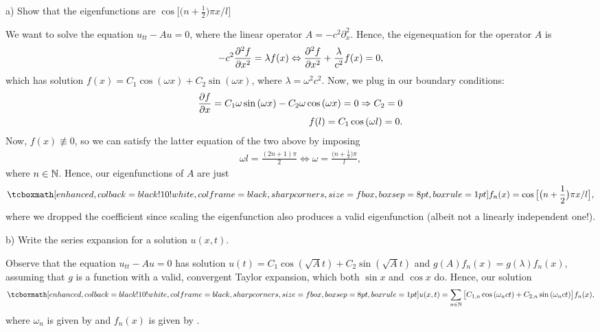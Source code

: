 \def\duedate{10/13/22}
\def\HWnum{5}



    


a) Show that the eigenfunctions are $\cos{\big[ \big( n+\frac{1}{2} \big) \pi x / l \big]}$

We want to solve the equation $u_{tt} - Au = 0$, where the linear operator $A = -c^2\partial_{x}^2$.
Hence, the eigenequation for the operator $A$ is 
\begin{eqnarray}
    \label{eq:eigeneq}
    -c^2 \pdv[2]{f}{x} = \lambda f(x) \Leftrightarrow \pdv[2]{f}{x} + \frac{\lambda}{c^2}f(x) = 0
,\end{eqnarray}
which has solution $f(x) = C_1 \cos{(\omega x)} + C_{2} \sin{(\omega x)}$, where $\lambda = \omega^2 c^2$.
Now, we plug in our boundary conditions:
\begin{align}
    \label{eq:solve-C2}
    \pdv{f}{x} = C_{1}\omega \sin{(\omega x)} - C_{2}\omega\cos{(\omega x)} = 0 \Rightarrow C_{2} = 0 \\
    f(l) = C_1 \cos{(\omega l)} = 0
.\end{align}
Now, $f(x) \not\equiv 0$, so we can satisfy the latter equation of the two above by imposing
\begin{eqnarray}
    \label{eq:solve-omega}
    \omega l = \frac{(2n+1)\pi}{2} \Leftrightarrow \omega = \frac{\big(n + \frac{1}{2}\big)\pi}{l}
,\end{eqnarray}
where $n \in \mathbb{N}$.
Hence, our eigenfunctions of $A$ are just
\begin{eqnarray}
    \label{eq:eigenfuncs}
    \eqbox{
    f_{n}(x) = \cos{\big[ \big(n+\frac{1}{2}\big)\pi x / l \big]}
}
,\end{eqnarray}
where we dropped the coefficient since scaling the eigenfunction also produces a valid eigenfunction (albeit not a linearly independent one!).

b) Write the series expansion for a solution $u(x,t)$.

Observe that the equation $u_{tt} - Au = 0$ has solution $u(t) = C_1 \cos{(\sqrt{A} t)} + C_2 \sin{(\sqrt{A} t)}$ and $g(A)f_{n}(x) = g(\lambda)f_{n}(x)$, assuming that $g$ is a function with a valid, convergent Taylor expansion, which both $\sin{x}$ and $\cos{x}$ do.
Hence, our solution
\begin{eqnarray}
    \label{eq:solution-general}
    \eqbox{
    u(x,t) = \sum_{n \in \naturals} \big[ C_{1,n} \cos{(\omega_{n}c t)} + C_{2,n} \sin{(\omega_{n} ct)} \big] f_{n}(x)
}
,\end{eqnarray}
where $\omega_{n}$ is given by  and $f_{n}(x)$ is given by .


